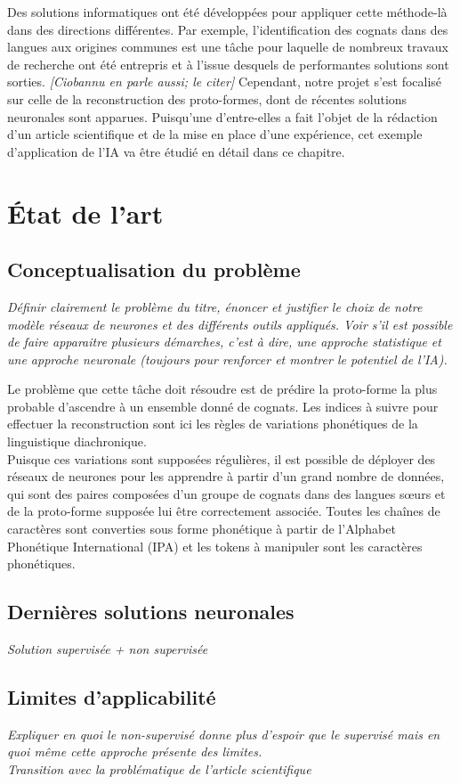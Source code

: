\documentclass[12pt, french, twoside]{report}
\begin{document}
Des solutions informatiques ont été développées pour appliquer cette méthode-là dans des directions différentes. Par exemple, l'identification des cognats dans des langues aux origines communes est une tâche pour laquelle de nombreux travaux de recherche ont été entrepris et à l'issue desquels de performantes solutions sont sorties.\cite{fourrier} \textit{[Ciobannu en parle aussi; le citer]} Cependant, notre projet s'est focalisé sur celle de la reconstruction des proto-formes, dont de récentes solutions neuronales sont apparues. Puisqu'une d'entre-elles a fait l'objet de la rédaction d'un article scientifique et de la mise en place d'une expérience, cet exemple d'application de l'IA va être étudié en détail dans ce chapitre.
\section{État de l'art}
\subsection{Conceptualisation du problème}
\textit{Définir clairement le problème du titre, énoncer et justifier le choix de notre modèle réseaux de neurones et des différents outils appliqués. Voir s'il est possible de faire apparaitre plusieurs démarches, c'est à dire, une approche statistique et une approche neuronale (toujours pour renforcer et montrer le potentiel de l'IA).}

Le problème que cette tâche doit résoudre est de prédire la proto-forme la plus probable d'ascendre à un ensemble donné de cognats. Les indices à suivre pour effectuer la reconstruction sont ici les règles de variations phonétiques de la linguistique diachronique.\\
Puisque ces variations sont supposées régulières, il est possible de déployer des réseaux de neurones pour les apprendre à partir d'un grand nombre de données, qui sont des paires composées d'un groupe de cognats dans des langues s\oe{}urs et de la proto-forme supposée lui être correctement associée. Toutes les chaînes de caractères sont converties sous forme phonétique à partir de l'Alphabet Phonétique International (IPA) et les tokens à manipuler sont les caractères phonétiques.
\subsection{Dernières solutions neuronales}
\textit{Solution supervisée + non supervisée}


\subsection{Limites d'applicabilité}
\textit{Expliquer en quoi le non-supervisé donne plus d'espoir que le supervisé mais en quoi même cette approche présente des limites.}\\
\textit{Transition avec la problématique de l'article scientifique}\\
\end{document}

